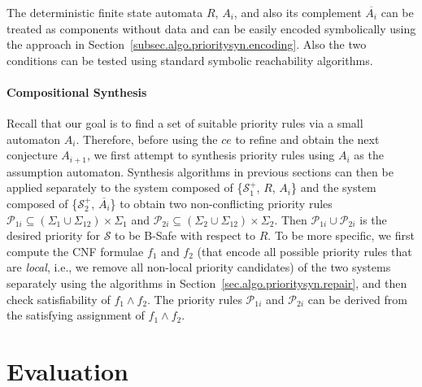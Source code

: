 \documentclass[10pt, a4paper, onecolumn, conference, compsocconf]{IEEEtran}
\begin{document}
The deterministic finite state automata $R$, $A_i$, and also its complement $\overline{A_i}$ can be treated as components without data and can be easily encoded symbolically using the approach in Section~\ref{subsec.algo.prioritysyn.encoding}. Also the two conditions can be tested using standard symbolic reachability algorithms.

\paragraph{Compositional Synthesis} Recall that our goal is to find a set of suitable priority rules via a small automaton $A_i$. Therefore, before using the $ce$ to refine and obtain the next conjecture $A_{i+1}$, we first attempt to synthesis priority rules using $A_i$ as the assumption automaton.
Synthesis algorithms in previous sections can then be applied separately to the system composed of \{$\mathcal{S}_{1}^+$, $R$, $A_i$\} and the system composed of \{$\mathcal{S}_{2}^+$, $\overline{A_i}$\} to obtain two non-conflicting priority rules $\mathcal{P}_{1i}\subseteq (\Sigma_1\cup\Sigma_{12})\times\Sigma_1$ and $\mathcal{P}_{2i}\subseteq (\Sigma_2\cup\Sigma_{12})\times\Sigma_2$. Then $\mathcal{P}_{1i} \cup \mathcal{P}_{2i}$ is the desired priority for $\mathcal{S}$ to be B-Safe with respect to $R$.
To be more specific, we first compute the CNF formulae $f_1$ and $f_2$ (that encode all possible priority rules that are \emph{local}, i.e., we remove all non-local priority candidates) of the two systems separately using the algorithms in Section~\ref{sec.algo.prioritysyn.repair}, and then check satisfiability of $f_1 \wedge f_2$.
The priority rules $\mathcal{P}_{1i}$ and $\mathcal{P}_{2i}$ can be derived from the satisfying assignment of $f_1 \wedge f_2$.




\section{Evaluation\label{sec.algo.prioritysyn.evaluation}}
\end{document}
